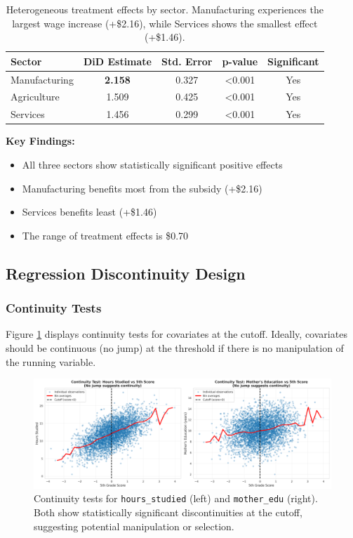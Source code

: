 \documentclass[a4paper,12pt,headsepline]{scrartcl} %
\begin{document}
\begin{table}[H]
\centering
\begin{tabular}{lcccc}
\toprule
Sector & DiD Estimate & Std. Error & p-value & Significant \\
\midrule
Manufacturing & \textbf{2.158} & 0.327 & <0.001 & Yes \\
Agriculture & 1.509 & 0.425 & <0.001 & Yes \\
Services & 1.456 & 0.299 & <0.001 & Yes \\
\bottomrule
\end{tabular}
\caption{Heterogeneous treatment effects by sector. Manufacturing experiences the largest wage increase (+\$2.16), while Services shows the smallest effect (+\$1.46).}
\label{tab:heterogeneous}
\end{table}

\textbf{Key Findings:}
\begin{itemize}
    \item All three sectors show statistically significant positive effects
    \item Manufacturing benefits most from the subsidy (+\$2.16)
    \item Services benefits least (+\$1.46)
    \item The range of treatment effects is \$0.70
\end{itemize}

\subsection{Regression Discontinuity Design}

\subsubsection{Continuity Tests}

Figure \ref{fig:continuity} displays continuity tests for covariates at the cutoff. Ideally, covariates should be continuous (no jump) at the threshold if there is no manipulation of the running variable.

\begin{figure}[H]
    \centering
    \includegraphics[width=\textwidth]{continuity_test_plot.png}
    \caption{Continuity tests for \texttt{hours\_studied} (left) and \texttt{mother\_edu} (right). Both show statistically significant discontinuities at the cutoff, suggesting potential manipulation or selection.}
    \label{fig:continuity}
\end{figure}
\end{document}
